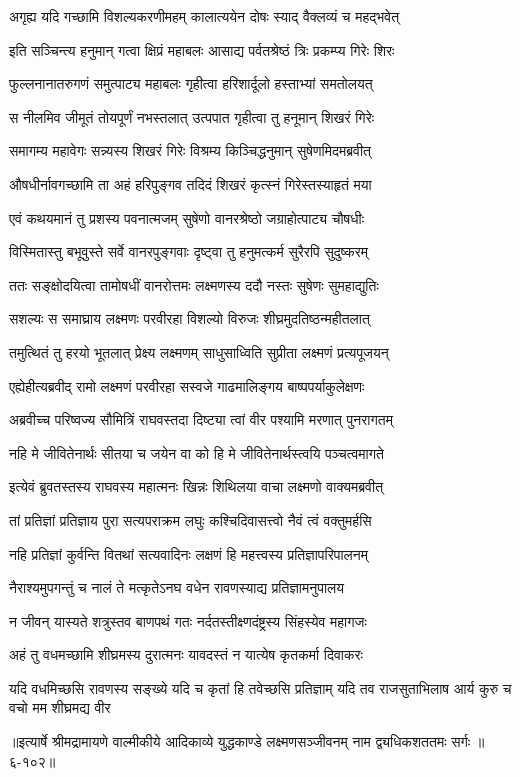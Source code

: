 \twolineshloka
{अगृह्य यदि गच्छामि विशल्यकरणीमहम्}
{कालात्ययेन दोषः स्याद् वैक्लव्यं च महद्भवेत्} %

\twolineshloka
{इति सञ्चिन्त्य हनुमान् गत्वा क्षिप्रं महाबलः}
{आसाद्य पर्वतश्रेष्ठं त्रिः प्रकम्प्य गिरेः शिरः} %

\twolineshloka
{फुल्लनानातरुगणं समुत्पाट्य महाबलः}
{गृहीत्वा हरिशार्दूलो हस्ताभ्यां समतोलयत्} %

\twolineshloka
{स नीलमिव जीमूतं तोयपूर्णं नभस्तलात्}
{उत्पपात गृहीत्वा तु हनूमान् शिखरं गिरेः} %

\twolineshloka
{समागम्य महावेगः सन्न्यस्य शिखरं गिरेः}
{विश्रम्य किञ्चिद्धनुमान् सुषेणमिदमब्रवीत्} %

\twolineshloka
{औषधीर्नावगच्छामि ता अहं हरिपुङ्गव}
{तदिदं शिखरं कृत्स्नं गिरेस्तस्याहृतं मया} %

\twolineshloka
{एवं कथयमानं तु प्रशस्य पवनात्मजम्}
{सुषेणो वानरश्रेष्ठो जग्राहोत्पाट्य चौषधीः} %

\twolineshloka
{विस्मितास्तु बभूवुस्ते सर्वे वानरपुङ्गवाः}
{दृष्ट्वा तु हनुमत्कर्म सुरैरपि सुदुष्करम्} %

\twolineshloka
{ततः सङ्क्षोदयित्वा तामोषधीं वानरोत्तमः}
{लक्ष्मणस्य ददौ नस्तः सुषेणः सुमहाद्युतिः} %

\twolineshloka
{सशल्यः स समाघ्राय लक्ष्मणः परवीरहा}
{विशल्यो विरुजः शीघ्रमुदतिष्ठन्महीतलात्} %

\twolineshloka
{तमुत्थितं तु हरयो भूतलात् प्रेक्ष्य लक्ष्मणम्}
{साधुसाध्विति सुप्रीता लक्ष्मणं प्रत्यपूजयन्} %

\twolineshloka
{एह्येहीत्यब्रवीद् रामो लक्ष्मणं परवीरहा}
{सस्वजे गाढमालिङ्गय बाष्पपर्याकुलेक्षणः} %

\twolineshloka
{अब्रवीच्च परिष्वज्य सौमित्रिं राघवस्तदा}
{दिष्ट्या त्वां वीर पश्यामि मरणात् पुनरागतम्} %

\twolineshloka
{नहि मे जीवितेनार्थः सीतया च जयेन वा}
{को हि मे जीवितेनार्थस्त्वयि पञ्चत्वमागते} %

\twolineshloka
{इत्येवं ब्रुवतस्तस्य राघवस्य महात्मनः}
{खिन्नः शिथिलया वाचा लक्ष्मणो वाक्यमब्रवीत्} %

\twolineshloka
{तां प्रतिज्ञां प्रतिज्ञाय पुरा सत्यपराक्रम}
{लघुः कश्चिदिवासत्त्वो नैवं त्वं वक्तुमर्हसि} %

\twolineshloka
{नहि प्रतिज्ञां कुर्वन्ति वितथां सत्यवादिनः}
{लक्षणं हि महत्त्वस्य प्रतिज्ञापरिपालनम्} %

\twolineshloka
{नैराश्यमुपगन्तुं च नालं ते मत्कृतेऽनघ}
{वधेन रावणस्याद्य प्रतिज्ञामनुपालय} %

\twolineshloka
{न जीवन् यास्यते शत्रुस्तव बाणपथं गतः}
{नर्दतस्तीक्ष्णदंष्ट्रस्य सिंहस्येव महागजः} %

\twolineshloka
{अहं तु वधमच्छामि शीघ्रमस्य दुरात्मनः}
{यावदस्तं न यात्येष कृतकर्मा दिवाकरः} %

\twolineshloka
{यदि वधमिच्छसि रावणस्य सङ्ख्ये यदि च कृतां हि तवेच्छसि प्रतिज्ञाम्}
{यदि तव राजसुताभिलाष आर्य कुरु च वचो मम शीघ्रमद्य वीर} %


॥इत्यार्षे श्रीमद्रामायणे वाल्मीकीये आदिकाव्ये युद्धकाण्डे लक्ष्मणसञ्जीवनम् नाम द्व्यधिकशततमः सर्गः ॥६-१०२॥
